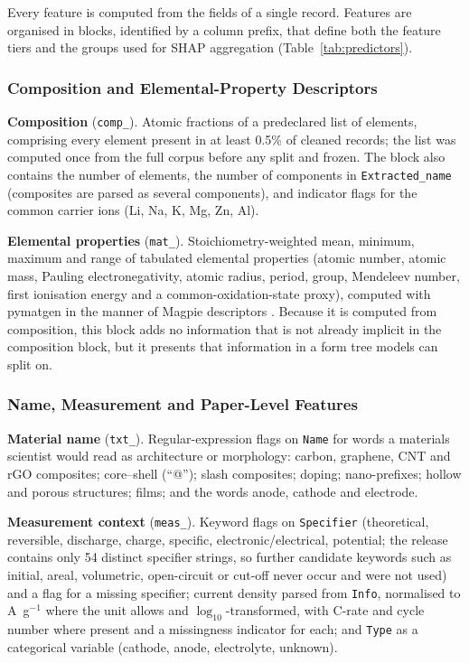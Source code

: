 \documentclass[journal=jcisd8,manuscript=article,layout=traditional]{achemso}
\begin{document}
Every feature is computed from the fields of a single record. Features are organised in blocks, identified by a column prefix, that define both the feature tiers and the groups used for SHAP aggregation (Table~\ref{tab:predictors}).

\subsubsection{Composition and Elemental-Property Descriptors}

\textbf{Composition} (\texttt{comp\_}). Atomic fractions of a predeclared list of elements, comprising every element present in at least 0.5\% of cleaned records; the list was computed once from the full corpus before any split and frozen. The block also contains the number of elements, the number of components in \texttt{Extracted\_name} (composites are parsed as several components), and indicator flags for the common carrier ions (Li, Na, K, Mg, Zn, Al).

\textbf{Elemental properties} (\texttt{mat\_}). Stoichiometry-weighted mean, minimum, maximum and range of tabulated elemental properties (atomic number, atomic mass, Pauling electronegativity, atomic radius, period, group, Mendeleev number, first ionisation energy and a common-oxidation-state proxy), computed with pymatgen \cite{ong2013pymatgen} in the manner of Magpie descriptors \cite{ward2016magpie}. Because it is computed from composition, this block adds no information that is not already implicit in the composition block, but it presents that information in a form tree models can split on.

\subsubsection{Name, Measurement and Paper-Level Features}

\textbf{Material name} (\texttt{txt\_}). Regular-expression flags on \texttt{Name} for words a materials scientist would read as architecture or morphology: carbon, graphene, CNT and rGO composites; core--shell (``@''); slash composites; doping; nano-prefixes; hollow and porous structures; films; and the words anode, cathode and electrode.

\textbf{Measurement context} (\texttt{meas\_}). Keyword flags on \texttt{Specifier} (theoretical, reversible, discharge, charge, specific, electronic/electrical, potential; the release contains only 54 distinct specifier strings, so further candidate keywords such as initial, areal, volumetric, open-circuit or cut-off never occur and were not used) and a flag for a missing specifier; current density parsed from \texttt{Info}, normalised to A~g$^{-1}$ where the unit allows and $\log_{10}$-transformed, with C-rate and cycle number where present and a missingness indicator for each; and \texttt{Type} as a categorical variable (cathode, anode, electrolyte, unknown).
\end{document}
